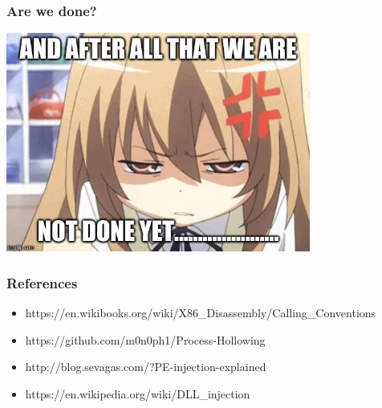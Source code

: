 \documentclass[aspectratio=169]{beamer}
\begin{document}
{
\begin{frame}
  \frametitle{Are we done?}
  \begin{center}
    \includegraphics[width=10cm]{frustrated-meme}
  \end{center}
\end{frame}
}

\begin{frame}
  \frametitle{References}
  \begin{center}
    \begin{itemize}
      \item{https://en.wikibooks.org/wiki/X86\_Disassembly/Calling\_Conventions}
      \item{https://github.com/m0n0ph1/Process-Hollowing}
      \item{http://blog.sevagas.com/?PE-injection-explained}
      \item{https://en.wikipedia.org/wiki/DLL\_injection}
    \end{itemize}
  \end{center}
\end{frame}
\end{document}

